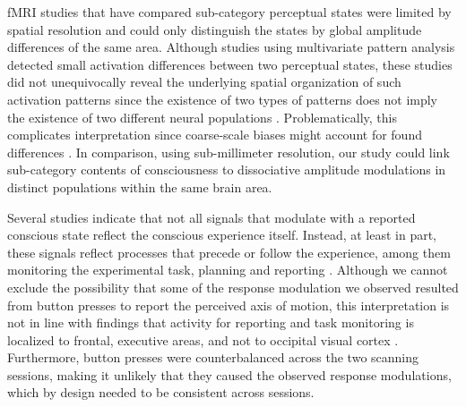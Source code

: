 fMRI studies that have compared sub-category perceptual states \parencite{Sterzer2002,Muckli2002,Castelo-Branco2002} were limited by spatial resolution and could only distinguish the states by global amplitude differences of the same area. Although studies using multivariate pattern analysis \parencite{Kamitani2006, Brouwer2007} detected small activation differences between two perceptual states, these studies did not unequivocally reveal the underlying spatial organization of such activation patterns \parencite{Logothetis2008} since the existence of two types of patterns does not imply the existence of two different neural populations \parencite{Bartels2008}. Problematically, this complicates interpretation since coarse-scale biases might account for found differences \parencite{Wang2014}. In comparison, using sub-millimeter resolution, our study could link sub-category contents of consciousness to dissociative amplitude modulations in distinct populations within the same brain area.

Several studies indicate that not all signals that modulate with a reported conscious state reflect the conscious experience itself. Instead, at least in part, these signals reflect processes that precede or follow the experience, among them monitoring the experimental task, planning and reporting \parencite{Koch2016,DeGraaf2012,Frassle2014}. Although we cannot exclude the possibility that some of the response modulation we observed resulted from button presses to report the perceived axis of motion, this interpretation is not in line with findings that activity for reporting and task monitoring is localized to frontal, executive areas, and not to occipital visual cortex \parencite{Frassle2014}. Furthermore, button presses were counterbalanced across the two scanning sessions, making it unlikely that they caused the observed response modulations, which by design needed to be consistent across sessions.

